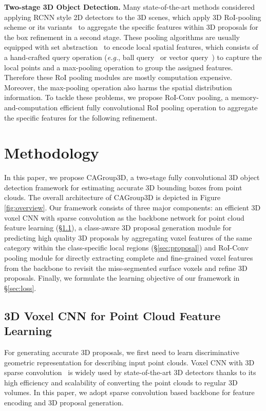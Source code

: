 \documentclass{article}
\begin{document}
\textbf{Two-stage 3D Object Detection.} Many state-of-the-art methods considered applying RCNN style 2D detectors to the 3D scenes, which apply 3D RoI-pooling scheme or its variants~\cite{shi2019pointrcnn,shi2020p2,deng2020voxel,shi2020pv,yang2019std,xu2022fusionrcnn} to aggregate the specific features within 3D proposals for the box refinement in a second stage. These pooling algorithms are usually equipped with set abstraction~\cite{qi2017pointnet} to encode local spatial features, which consists of a hand-crafted query operation (\textit{e.g.}, ball query~\cite{qi2017pointnet} or vector query~\cite{deng2020voxel}) to capture the local points and a max-pooling operation to group the assigned features. Therefore these RoI pooling modules are mostly computation expensive. Moreover, the max-pooling operation also harms the spatial distribution information. To tackle these problems, we propose RoI-Conv pooling, a memory-and-computation efficient fully convolutional RoI pooling operation to aggregate the specific features for the following refinement. 

\section{Methodology}
In this paper, we propose CAGroup3D, a two-stage fully convolutional 3D object detection framework for estimating accurate 3D bounding boxes from point clouds. The overall architecture of CAGroup3D is depicted in Figure \ref{fig:overview}. Our framework consists of three major components: an efficient 3D voxel CNN with sparse convolution as the backbone network for point cloud feature learning (\S \ref{sec:backbone}), a class-aware 3D proposal generation module for predicting high quality 3D proposals by aggregating voxel features of the same category within the class-specific local regions (\S \ref{sec:proposal}) and RoI-Conv pooling module for directly extracting complete and fine-grained voxel features from the backbone 
to revisit the miss-segmented surface voxels and refine 3D proposals. Finally, we formulate the learning objective of our framework in \S \ref{sec:loss}. 
 
\subsection{3D Voxel CNN for Point Cloud Feature Learning}\label{sec:backbone}
For generating accurate 3D proposals, we first need to learn discriminative geometric representation for describing input point clouds. Voxel CNN with 3D sparse convolution~\cite{shi2020p2,yan2018second,zhou2018voxelnet,graham20183d,graham2017submanifold} is widely used by state-of-the-art 3D detectors thanks to its high efficiency and scalability of converting the point clouds to regular 3D volumes. In this paper, we adopt sparse convolution based backbone for feature encoding and 3D proposal generation.
\end{document}
